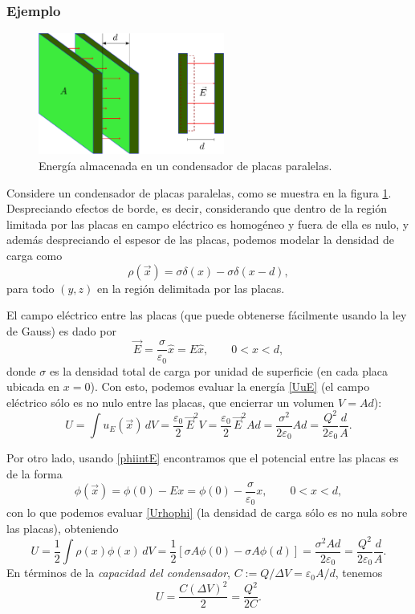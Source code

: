 \subsubsection{Ejemplo}
\begin{figure}[!h]
\centerline{\includegraphics[height=4cm]{fig/fig-condensador-01.pdf}}
\caption{Energía almacenada en un condensador de placas paralelas.}
\label{fig:cpp}
\end{figure}
Considere un condensador de placas paralelas, como se muestra en la figura \ref{fig:cpp}. Despreciando efectos de borde, es decir, considerando que dentro de la región limitada por las placas en campo eléctrico es homogéneo y fuera de ella es nulo, y además despreciando el espesor de las placas, podemos modelar la densidad de carga como
\begin{equation}
\rho(\vec{x})=\sigma\delta(x)-\sigma\delta(x-d), 
\end{equation}
para todo $(y,z)$ en la región delimitada por las placas. 

El campo eléctrico entre las placas (que puede obtenerse fácilmente usando la ley de Gauss) es dado por
\begin{equation}
\vec{E}=\frac{\sigma}{\varepsilon_0}\hat{x}=E\hat{x}, \qquad 0<x<d,
\end{equation}
donde $\sigma$ es la densidad total de carga por unidad de superficie (en cada placa ubicada en $x=0$). Con esto, podemos evaluar la energía \eqref{UuE} (el campo eléctrico sólo es no nulo entre las placas, que encierrar un volumen $V=Ad$):
\begin{equation} 
U=\int u_E(\vec{x})\,dV=\frac{\varepsilon_0}{2}\,
\vec{E}^2 V=\frac{\varepsilon_0}{2}\,
\vec{E}^2 Ad=\frac{\sigma^2}{2\varepsilon_0}Ad=\frac{Q^2}{2\varepsilon_0}\frac{d}{A} .
\end{equation}

Por otro lado, usando \eqref{phiintE} encontramos que el potencial entre las placas es de la forma
\begin{equation}
\phi(\vec{x})=\phi(0)-Ex=\phi(0)-\frac{\sigma}{\varepsilon_0}x, \qquad 0<x<d,
\end{equation}
con lo que podemos evaluar \eqref{Urhophi} (la densidad de carga sólo es no nula sobre las placas), obteniendo
\begin{equation}
U=\frac{1}{2}\int\rho(x)\phi(x)\,dV=\frac{1}{2}\left[\sigma A\phi(0)-\sigma A\phi(d)\right]=\frac{\sigma^2 Ad}{2\varepsilon_0}=\frac{Q^2}{2\varepsilon_0}\frac{d}{A}.
\end{equation}
En términos de la \textit{capacidad del condensador}, $C:=Q/\Delta V=\varepsilon_0 A/d$, tenemos
\begin{equation}
U=\frac{C(\Delta V)^2}{2}=\frac{Q^2}{2C}.
\end{equation}





